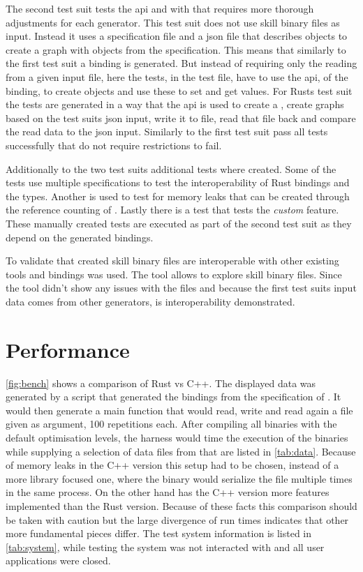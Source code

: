 \documentclass[thesis]{subfiles}
\begin{document}
  The second test suit tests the \gls{api} and with that requires more thorough adjustments for each generator.
  This test suit does not use \gls{skill} binary files as input.
  Instead it uses a specification file and a \gls{json} file that describes objects to create a graph with objects from the specification.
  This means that similarly to the first test suit a binding is generated.
  But instead of requiring only the reading from a given input file, here the tests, in the test file, have to use the \gls{api}, of the binding, to create objects and use these to set and get values.
  For Rusts test suit the tests are generated in a way that the \gls{api} is used to create a \SkillFile, create graphs based on the test suits \gls{json} input, write it to file, read that file back and compare the read data to the \gls{json} input.
  Similarly to the first test suit pass all tests successfully that do not require restrictions to fail.

  Additionally to the two test suits additional tests where created.
  Some of the tests use multiple specifications to test the interoperability of Rust bindings and the \Foreign types.
  Another is used to test for memory leaks that can be created through the reference counting of \PtrT.
  Lastly there is a test that tests the \emph{custom} feature.
  These manually created tests are executed as part of the second test suit as they depend on the generated bindings.

  To validate that created \gls{skill} binary files are interoperable with other existing tools and bindings \autocite{skill-view} was used.
  The tool allows to explore \gls{skill} binary files.
  Since the tool didn't show any issues with the files and because the first test suits input data comes from other generators, is interoperability demonstrated.

\section{Performance}
  \autoref{fig:bench} shows a comparison of Rust vs C++.
  The displayed data was generated by a script that generated the bindings from the specification of \autocite{skill-llvm}.
  It would then generate a main function that would read, write and read again a file given as argument, 100 repetitions each.
  After compiling all binaries with the default optimisation levels, the harness would time the execution of the binaries while supplying a selection of data files from \autocite{skill-llvm} that are listed in \autoref{tab:data}.
  Because of memory leaks in the C++ version this setup had to be chosen, instead of a more library focused one, where the binary would serialize the file multiple times in the same process.
  On the other hand has the C++ version more features implemented than the Rust version.
  Because of these facts this comparison should be taken with caution but the large divergence of run times indicates that other more fundamental pieces differ.
  The test system information is listed in \autoref{tab:system}, while testing the system was not interacted with and all user applications were closed.
\end{document}
